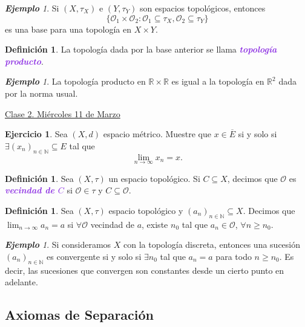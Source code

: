 \documentclass{article}
\theoremstyle{definition}
\newtheorem{definition}[theorem]{Definición}
\newtheorem{exercise}{Ejercicio}
\theoremstyle{remark}
\newtheorem{example}[theorem]{\textbf{Ejemplo}}
\numberwithin{equation}{section}
\newcommand{\N}{\mathbb{N}}
\renewcommand{\O}{\mathcal{O}}
\newcommand{\R}{\mathbb{R}}
\renewcommand{\t}{\tau}
\newcommand{\oo}{\infty}
\renewcommand{\bar}{\overline}
\newcommand{\wea}[1]{\textcolor{BlueViolet}{\textbf{\emph{#1}}}}
\newcommand{\fecha}[1]{\begin{flushright} \underline{#1} \end{flushright}}
\begin{document}
\begin{example}
  Si $(X,\t_X)$ e $(Y,\t_Y)$ son espacios topológicos, entonces
  \[\{\O_1 \times \O_2 \colon \O_1 \subseteq \t_X, \O_2 \subseteq \t_Y\}\]
  es una base para una topología en $X \times Y$.
\end{example}

\begin{definition}
  La topología dada por la base anterior se llama \wea{topología producto}.
\end{definition}

\begin{example}
  La topología producto en $\R \times \R$ es igual a la topología en $\R^2$ dada por la norma usual.
\end{example}

\fecha{Clase 2. Miércoles 11 de Marzo}
\begin{exercise}
  Sea $(X,d)$ espacio métrico. Muestre que $x \in \bar{E}$ si y solo si $\exists (x_n)_{n\in\N} \subseteq E$ tal que
  \[\lim_{n\to\oo} x_n = x.\]
\end{exercise}

\begin{definition}
  Sea $(X,\t)$ un espacio topológico. Si $C \subseteq X$, decimos que $\O$ es \wea{vecindad de $C$} si $\O\in\t$ y $C \subseteq \O$.
\end{definition}

\begin{definition}
  Sea $(X,\t)$ espacio topológico y $(a_n)_{n\in\N} \subseteq X$. Decimos que $\lim_{n\to\oo} a_n = a$ si $\forall \O$ vecindad de $a$, existe $n_0$ tal que $a_n \in \O$, $\forall n \geq n_0$.
\end{definition}

\begin{example}
  Si consideramos $X$ con la topología discreta, entonces una sucesión $(a_n)_{n\in\N}$ es convergente si y solo si $\exists n_0$ tal que $a_n = a$ para todo $n \geq n_0$. Es decir, las sucesiones que convergen son constantes desde un cierto punto en adelante.
\end{example}

\newpage
\subsection{Axiomas de Separación}
\end{document}
